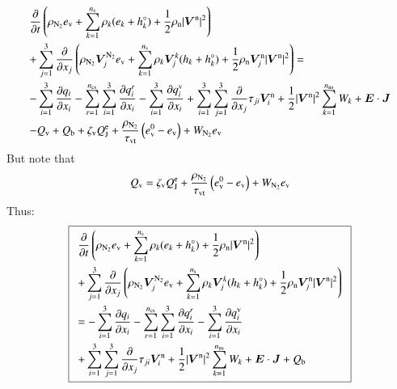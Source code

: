 \documentclass{warpdoc}
\newcommand\frameeqn[1]{\fbox{$\displaystyle #1$}}
\newcommand{\alb}{\vspace{0.1cm}\\} %
\newcommand{\mfd}{\displaystyle}
\newcommand{\ns}{{n_{\rm s}}}
\newcommand{\nns}{{n_{\rm ns}}}
\newcommand{\ncs}{{n_{\rm cs}}}
\newcommand{\ev}{{e_{\rm v}}}
\newcommand{\evzero}{{e_{\rm v}^0}}
\newcommand{\tauvt}{\tau_{\rm vt}}
\renewcommand{\vec}[1]{\bm{#1}}
\begin{document}
\begin{equation}
\begin{array}{l}\mfd
 \frac{\partial }{\partial t}\left(\rho_{\rm N_2} \ev+\sum_{k=1}^\ns \rho_k (e_k+h_k^\circ)+\frac{1}{2}\rho_{\rm n}|\vec{V}^{\rm n}|^2 \right)\alb\mfd 
+ \sum_{j=1}^3  \frac{\partial }{\partial x_j} \left(\rho_{\rm N_2} \vec{V}_j^{\rm N_2} \ev + \sum_{k=1}^\ns \rho_k \vec{V}^k_j (h_k+h_k^\circ)+\frac{1}{2}\rho_{\rm n}\vec{V}^{\rm n}_j|\vec{V}^{\rm n}|^2 \right)
= \alb\mfd
-\sum_{i=1}^{3}\frac{\partial q_i}{\partial x_i}
- \sum_{r=1}^\ncs \sum_{i=1}^{3}\frac{\partial q_i^r}{\partial x_i}
-\sum_{i=1}^{3}\frac{\partial q_i^{\rm v}}{\partial x_i}
+\sum_{i=1}^3 \sum_{j=1}^3  \frac{\partial }{\partial x_j} \tau_{ji} \vec{V}_i^{\rm n}
+\frac{1}{2}|\vec{V}^{\rm n}|^2 \sum_{k=1}^\nns W_k
+ \vec{E}\cdot\vec{J}
\alb\mfd
-  Q_{\rm v}
+ Q_{\rm b}
+ \zeta_{\rm v} Q_{\rm J}^{\rm e}   
+ {\frac{\rho_{\rm N_2}}{\tauvt}}\left( \evzero-\ev \right) + W_{\rm N_2} \ev
\end{array}
\end{equation}
%  
But note that
%
\begin{equation}
Q_{\rm v}= \zeta_{\rm v}Q_{\rm J}^{\rm e}+ {\frac{\rho_{\rm N_2}}{\tauvt}}\left( \evzero-\ev \right) + W_{\rm N_2} \ev
\end{equation}
%
Thus:
%
\begin{equation}
\frameeqn{
\begin{array}{l}\mfd
 \frac{\partial }{\partial t}\left(\rho_{\rm N_2} \ev+\sum_{k=1}^\ns \rho_k (e_k+h_k^\circ)+\frac{1}{2}\rho_{\rm n}|\vec{V}^{\rm n}|^2 \right) \alb\mfd
+ \sum_{j=1}^3  \frac{\partial }{\partial x_j} \left(\rho_{\rm N_2} \vec{V}_j^{\rm N_2} \ev + \sum_{k=1}^\ns \rho_k \vec{V}^k_j (h_k+h_k^\circ)+\frac{1}{2}\rho_{\rm n}\vec{V}^{\rm n}_j|\vec{V}^{\rm n}|^2 \right)
 \alb\mfd
=
-\sum_{i=1}^{3}\frac{\partial q_i}{\partial x_i}
- \sum_{r=1}^\ncs \sum_{i=1}^{3}\frac{\partial q_i^r}{\partial x_i}
-\sum_{i=1}^{3}\frac{\partial q_i^{\rm v}}{\partial x_i}\alb\mfd
+\sum_{i=1}^3 \sum_{j=1}^3  \frac{\partial }{\partial x_j} \tau_{ji} \vec{V}_i^{\rm n}
+\frac{1}{2}|\vec{V}^{\rm n}|^2 \sum_{k=1}^\nns W_k
+ \vec{E}\cdot\vec{J}
+ Q_{\rm b}
\end{array}
}
\label{eqn:etotal1}
\end{equation}
%  
\end{document}
